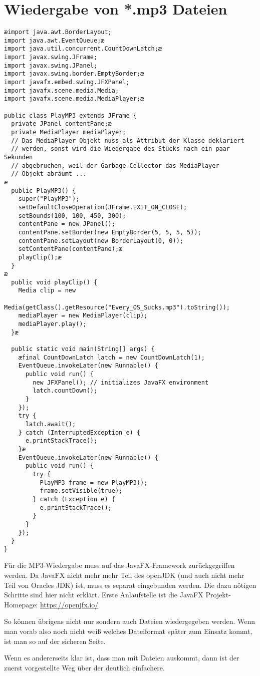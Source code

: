 \begin{minipage}{1.0\textwidth}
\section{Wiedergabe von *.mp3 Dateien}

\begin{lstlisting}
æimport java.awt.BorderLayout;
import java.awt.EventQueue;æ
import java.util.concurrent.CountDownLatch;æ
import javax.swing.JFrame;
import javax.swing.JPanel;
import javax.swing.border.EmptyBorder;æ
import javafx.embed.swing.JFXPanel;
import javafx.scene.media.Media;
import javafx.scene.media.MediaPlayer;æ

public class PlayMP3 extends JFrame {
  private JPanel contentPane;æ
  private MediaPlayer mediaPlayer;  
  // Das MediaPlayer Objekt nuss als Attribut der Klasse deklariert 
  // werden, sonst wird die Wiedergabe des Stücks nach ein paar Sekunden
  // abgebruchen, weil der Garbage Collector das MediaPlayer
  // Objekt abräumt ... 
æ
  public PlayMP3() {
    super("PlayMP3");
    setDefaultCloseOperation(JFrame.EXIT_ON_CLOSE);
    setBounds(100, 100, 450, 300);
    contentPane = new JPanel();
    contentPane.setBorder(new EmptyBorder(5, 5, 5, 5));
    contentPane.setLayout(new BorderLayout(0, 0));
    setContentPane(contentPane);æ
    playClip();æ
  }
æ
  public void playClip() {
    Media clip = new
         Media(getClass().getResource("Every_OS_Sucks.mp3").toString());
    mediaPlayer = new MediaPlayer(clip);
    mediaPlayer.play();
  }æ

  public static void main(String[] args) {
    æfinal CountDownLatch latch = new CountDownLatch(1);
    EventQueue.invokeLater(new Runnable() {
      public void run() {
        new JFXPanel(); // initializes JavaFX environment
        latch.countDown();
      }
    });
    try {
      latch.await();
    } catch (InterruptedException e) {
      e.printStackTrace();
    }æ
    EventQueue.invokeLater(new Runnable() {
      public void run() {
        try {
          PlayMP3 frame = new PlayMP3();
          frame.setVisible(true);
        } catch (Exception e) {
          e.printStackTrace();
        }
      }
    });
  }
}
\end{lstlisting}
\end{minipage}


Für die MP3-Wiedergabe muss auf das JavaFX-Framework
zurückgegriffen werden. Da JavaFX nicht mehr mehr Teil des openJDK (und auch nicht 
mehr Teil von Oracles JDK) ist, muss es separat eingebunden werden. Die dazu 
nötigen Schritte sind hier nicht erklärt. Erste Anlaufstelle ist die JavaFX 
Projekt-Homepage: \url{https://openjfx.io/}

So können übrigens nicht nur  sondern auch  Dateien
wiedergegeben werden. Wenn man vorab also noch nicht weiß welches Dateiformat
später zum Einsatz kommt, ist man so auf der sicheren Seite.

Wenn es andererseits klar ist, dass man mit  Dateien auskommt,
dann ist der zuerst vorgestellte Weg über  der deutlich
einfachere.
